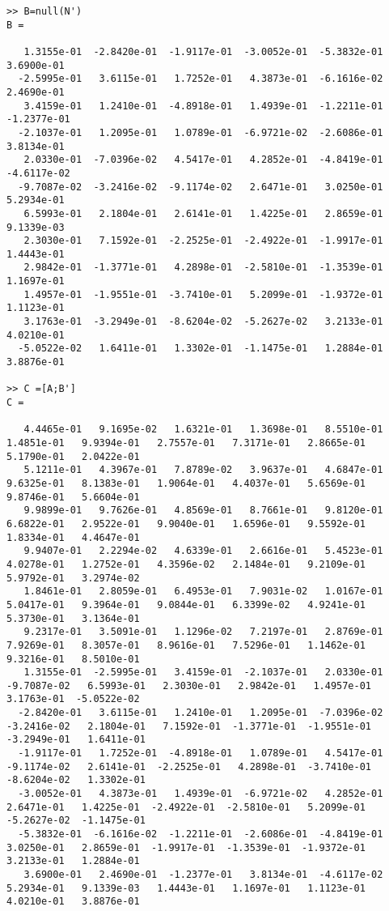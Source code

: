 \documentclass[a4paper,11pt]{article}
\begin{document}
\begin{Verbatim}[fontsize=\tiny]
>> B=null(N')
B =

   1.3155e-01  -2.8420e-01  -1.9117e-01  -3.0052e-01  -5.3832e-01   3.6900e-01
  -2.5995e-01   3.6115e-01   1.7252e-01   4.3873e-01  -6.1616e-02   2.4690e-01
   3.4159e-01   1.2410e-01  -4.8918e-01   1.4939e-01  -1.2211e-01  -1.2377e-01
  -2.1037e-01   1.2095e-01   1.0789e-01  -6.9721e-02  -2.6086e-01   3.8134e-01
   2.0330e-01  -7.0396e-02   4.5417e-01   4.2852e-01  -4.8419e-01  -4.6117e-02
  -9.7087e-02  -3.2416e-02  -9.1174e-02   2.6471e-01   3.0250e-01   5.2934e-01
   6.5993e-01   2.1804e-01   2.6141e-01   1.4225e-01   2.8659e-01   9.1339e-03
   2.3030e-01   7.1592e-01  -2.2525e-01  -2.4922e-01  -1.9917e-01   1.4443e-01
   2.9842e-01  -1.3771e-01   4.2898e-01  -2.5810e-01  -1.3539e-01   1.1697e-01
   1.4957e-01  -1.9551e-01  -3.7410e-01   5.2099e-01  -1.9372e-01   1.1123e-01
   3.1763e-01  -3.2949e-01  -8.6204e-02  -5.2627e-02   3.2133e-01   4.0210e-01
  -5.0522e-02   1.6411e-01   1.3302e-01  -1.1475e-01   1.2884e-01   3.8876e-01

>> C =[A;B']
C =

   4.4465e-01   9.1695e-02   1.6321e-01   1.3698e-01   8.5510e-01   1.4851e-01   9.9394e-01   2.7557e-01   7.3171e-01   2.8665e-01   5.1790e-01   2.0422e-01
   5.1211e-01   4.3967e-01   7.8789e-02   3.9637e-01   4.6847e-01   9.6325e-01   8.1383e-01   1.9064e-01   4.4037e-01   5.6569e-01   9.8746e-01   5.6604e-01
   9.9899e-01   9.7626e-01   4.8569e-01   8.7661e-01   9.8120e-01   6.6822e-01   2.9522e-01   9.9040e-01   1.6596e-01   9.5592e-01   1.8334e-01   4.4647e-01
   9.9407e-01   2.2294e-02   4.6339e-01   2.6616e-01   5.4523e-01   4.0278e-01   1.2752e-01   4.3596e-02   2.1484e-01   9.2109e-01   5.9792e-01   3.2974e-02
   1.8461e-01   2.8059e-01   6.4953e-01   7.9031e-02   1.0167e-01   5.0417e-01   9.3964e-01   9.0844e-01   6.3399e-02   4.9241e-01   5.3730e-01   3.1364e-01
   9.2317e-01   3.5091e-01   1.1296e-02   7.2197e-01   2.8769e-01   7.9269e-01   8.3057e-01   8.9616e-01   7.5296e-01   1.1462e-01   9.3216e-01   8.5010e-01
   1.3155e-01  -2.5995e-01   3.4159e-01  -2.1037e-01   2.0330e-01  -9.7087e-02   6.5993e-01   2.3030e-01   2.9842e-01   1.4957e-01   3.1763e-01  -5.0522e-02
  -2.8420e-01   3.6115e-01   1.2410e-01   1.2095e-01  -7.0396e-02  -3.2416e-02   2.1804e-01   7.1592e-01  -1.3771e-01  -1.9551e-01  -3.2949e-01   1.6411e-01
  -1.9117e-01   1.7252e-01  -4.8918e-01   1.0789e-01   4.5417e-01  -9.1174e-02   2.6141e-01  -2.2525e-01   4.2898e-01  -3.7410e-01  -8.6204e-02   1.3302e-01
  -3.0052e-01   4.3873e-01   1.4939e-01  -6.9721e-02   4.2852e-01   2.6471e-01   1.4225e-01  -2.4922e-01  -2.5810e-01   5.2099e-01  -5.2627e-02  -1.1475e-01
  -5.3832e-01  -6.1616e-02  -1.2211e-01  -2.6086e-01  -4.8419e-01   3.0250e-01   2.8659e-01  -1.9917e-01  -1.3539e-01  -1.9372e-01   3.2133e-01   1.2884e-01
   3.6900e-01   2.4690e-01  -1.2377e-01   3.8134e-01  -4.6117e-02   5.2934e-01   9.1339e-03   1.4443e-01   1.1697e-01   1.1123e-01   4.0210e-01   3.8876e-01


\end{Verbatim}
\end{document}
